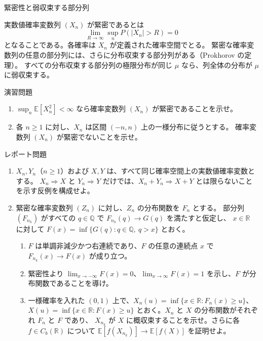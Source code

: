 \documentclass[a4paper,10pt,pdflatex,ja=standard,jafont=ipaex-type1,
  magstyle=real,scale=1]{bxjsarticle}
\newcommand{\topic}[1]{\par\vspace{5pt}
  {\large\sffamily\mdseries\color{accent}#1}\par\vspace{2pt}}
\newcommand{\R}{\mathbb R}
\newcommand{\E}{\mathbb E}
\begin{document}
\topic{緊密性と弱収束する部分列}
実数値確率変数列 $(X_n)$ が緊密であるとは
$$\lim_{R\to\infty}\sup_n P(|X_n|>R)=0$$
となることである。各確率は $X_n$ が定義された確率空間でとる。
緊密な確率変数列の任意の部分列には、さらに分布収束する部分列がある（Prokhorov の定理）。
すべての分布収束する部分列の極限分布が同じ $\mu$ なら、列全体の分布が $\mu$ に弱収束する。

\topic{演習問題}
\begin{enumerate}[label=\arabic*.]
\item $\sup_n\E[X_n^2]<\infty$ なら確率変数列 $(X_n)$ が緊密であることを示せ。
\item 各 $n\ge1$ に対し、$X_n$ は区間 $(-n,n)$ 上の一様分布に従うとする。
確率変数列 $(X_n)$ が緊密でないことを示せ。
\end{enumerate}

\topic{レポート問題}
\begin{enumerate}[label=\arabic*.]
\item $X_n,Y_n$（$n\ge1$）および $X,Y$ は、すべて同じ確率空間上の実数値確率変数とする。
$X_n\Rightarrow X$ と $Y_n\Rightarrow Y$ だけでは、$X_n+Y_n\Rightarrow X+Y$ とは限らないことを示す反例を構成せよ。
\item 緊密な確率変数列 $(Z_n)$ に対し、$Z_n$ の分布関数を $F_n$ とする。
部分列 $(F_{n_k})$ がすべての $q\in\mathbb Q$ で $F_{n_k}(q)\to G(q)$ を満たすと仮定し、
$x\in\R$ に対して $F(x)=\inf\{G(q):q\in\mathbb Q,\ q>x\}$ とおく。
\begin{enumerate}[label=(\arabic*),leftmargin=2.1em]
\item $F$ は単調非減少かつ右連続であり、$F$ の任意の連続点 $x$ で $F_{n_k}(x)\to F(x)$ が成り立つ。
\item 緊密性より $\lim_{x\to-\infty}F(x)=0$、$\lim_{x\to\infty}F(x)=1$ を示し、$F$ が分布関数であることを導け。
\item 一様確率を入れた $(0,1)$ 上で、$X_n(u)=\inf\{x\in\R:F_n(x)\ge u\}$、
$X(u)=\inf\{x\in\R:F(x)\ge u\}$ とおく。$X_n$ と $X$ の分布関数がそれぞれ $F_n$ と $F$ であり、
$X_{n_k}$ が $X$ に概収束することを示せ。さらに各 $f\in C_b(\R)$ について
$\E[f(X_{n_k})]\to\E[f(X)]$ を証明せよ。
\end{enumerate}
\end{enumerate}
\end{document}

